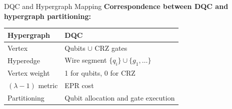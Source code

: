 \documentclass{beamer}
\begin{document}
	\begin{frame}{DQC and Hypergraph Mapping}
		\textbf{Correspondence between DQC and hypergraph partitioning:}
		\begin{center}
			\begin{tabular}{ll}
				\toprule
				\textbf{Hypergraph} & \textbf{DQC} \\
				\midrule
				Vertex & Qubits $\cup$ CRZ gates \\
				Hyperedge & Wire segment $\{q_i\} \cup \{g_1, \dots\}$ \\
				Vertex weight & 1 for qubits, 0 for CRZ \\
				$(\lambda - 1)$ metric & EPR cost \\
				Partitioning & Qubit allocation and gate execution \\
				\bottomrule
			\end{tabular}
		\end{center}
	\end{frame}
	
\end{document}
